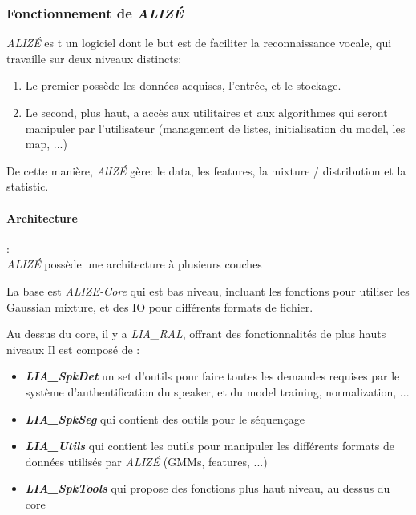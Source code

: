\subsubsection*{Fonctionnement de \textit{ALIZÉ}}
\textit{ALIZÉ} es
t un logiciel dont le but est de faciliter la reconnaissance vocale, qui travaille sur deux niveaux distincts:
\begin{enumerate}
    \item Le premier possède les données acquises, l'entrée, et le stockage.
    \item Le second, plus haut, a accès aux utilitaires et aux algorithmes qui seront manipuler par l'utilisateur (management de listes, initialisation du model, les map, ...)
\end{enumerate}

De cette manière, \textit{AlIZÉ} gère: le data, les features,  la mixture / distribution et la statistic.

\paragraph*{Architecture} :\\

\textit{ALIZÉ} possède une architecture à plusieurs couches

La base est \textit{ALIZE-Core} qui est bas niveau, incluant les fonctions pour utiliser les Gaussian mixture, et des IO pour différents formats de fichier.

Au dessus du core, il y a \textit{LIA\_RAL}, offrant des fonctionnalités de plus hauts niveaux
Il est composé de :
\begin{itemize}
    \item \textbf{\textit{LIA\_SpkDet}}  un set d'outils pour faire toutes les demandes requises par le système d'authentification du speaker, et du model training, normalization, ...
    \item \textbf{\textit{LIA\_SpkSeg}}  qui contient des outils pour le séquençage
    \item \textbf{\textit{LIA\_Utils}}  qui contient les outils pour manipuler les différents formats de données utilisés par \textit{ALIZÉ} (GMMs, features, ...)
    \item \textbf{\textit{LIA\_SpkTools}}  qui propose des fonctions plus haut niveau, au dessus du core

\end{itemize}


